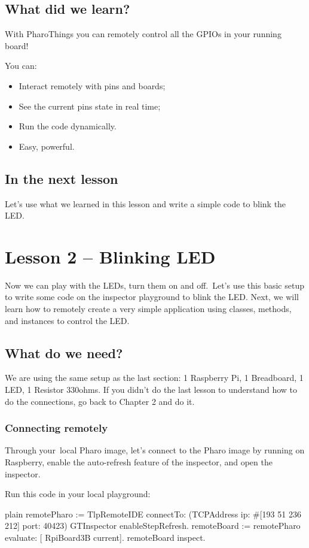 \documentclass[10pt,twoside,english]{_support/latex/sbabook/sbabook}
\begin{document}
\section{What did we learn?}
With PharoThings you can remotely control all the GPIOs in your running board!

You can:

\begin{itemize}
\item Interact remotely with pins and boards;
\item See the current pins state in real time;
\item Run the code dynamically.
\item Easy, powerful.
\end{itemize}
\section{In the next lesson}
Let’s use what we learned in this lesson and write a simple code to blink the LED.
\chapter{Lesson 2 – Blinking LED }
Now we can play with the LEDs, turn them on and off. Let's use this basic setup to write some code on the inspector playground to blink the LED. Next, we will learn how to remotely create a very simple application using classes, methods, and instances to control the LED.
\section{What do we need?}
We are using the same setup as the last section: 1 Raspberry Pi, 1 Breadboard, 1 LED, 1 Resistor 330ohms. If you didn't do the last lesson to understand how to do the connections, go back to Chapter 2 and do it.
\subsection{Connecting remotely}
Through your local Pharo image, let's connect to the Pharo image by running on Raspberry, enable the auto-refresh feature of the inspector, and open the inspector.

Run this code in your local playground:

\begin{displaycode}{plain}
remotePharo := TlpRemoteIDE connectTo: (TCPAddress ip: #[193 51 236 212] port: 40423)
GTInspector enableStepRefresh.
remoteBoard := remotePharo evaluate: [ RpiBoard3B current].
remoteBoard inspect.
\end{displaycode}
\end{document}
